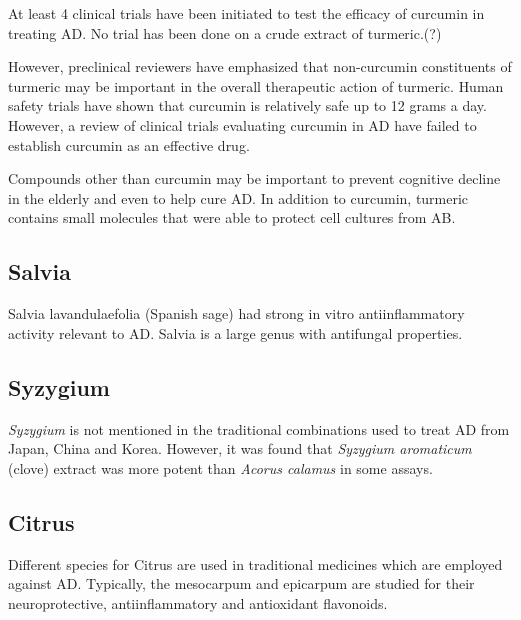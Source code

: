 At least 4 clinical trials have been initiated
to test the efficacy of curcumin in treating AD.
No trial has been done on a crude extract of turmeric.(?)


However, preclinical reviewers have emphasized that non-curcumin
constituents of turmeric may be important in the overall therapeutic
action of turmeric.
\cite{ahmed2014therapeutic}
Human safety trials have shown that curcumin is relatively safe
up to 12 grams a day.
However, a review of clinical trials evaluating curcumin
in AD have failed to establish curcumin as an effective drug.
\cite{hamaguchi2010review}

Compounds other than curcumin may be important to
prevent cognitive decline in the elderly
and even to help cure AD.
In addition to curcumin, turmeric contains small molecules
that were able to protect cell cultures from AB.
\cite{park2002discovery}



\subsection{Salvia}

Salvia lavandulaefolia (Spanish sage)
had strong in vitro antiinflammatory activity relevant to AD.
\cite{perry2001vitro}
Salvia is a large genus with antifungal properties.
\cite{yuce2014essential, tabanca2006chemical}



\subsection{Syzygium}

\textit{Syzygium} is not mentioned in the traditional combinations
used to treat AD
from Japan, China and Korea.
However, it was found that \textit{Syzygium aromaticum} (clove)
extract was more potent than \textit{Acorus calamus}
in some assays.
\cite{ขจร2001fungistatic}




\subsection{Citrus}

Different species for Citrus are used in traditional medicines
which are employed against AD.
Typically, the mesocarpum and epicarpum
are studied for their neuroprotective, antiinflammatory and antioxidant
flavonoids.
\cite{?}

